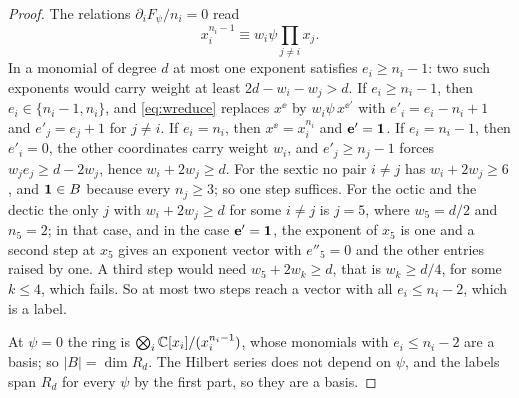 \begin{proof}
The relations $\partial_iF_\psi/n_i=0$ read
\begin{equation}\label{eq:wreduce}
x_i^{n_i-1}\equiv w_i\psi\prod_{j\ne i}x_j .
\end{equation}
In a monomial of degree $d$ at most one exponent satisfies $e_i\ge n_i-1$:
two such exponents would carry weight at least $2d-w_i-w_j>d$. If
$e_i\ge n_i-1$, then $e_i\in\{n_i-1,n_i\}$, and \eqref{eq:wreduce} replaces
$x^{\ee}$ by $w_i\psi\,x^{\ee'}$ with $e'_i=e_i-n_i+1$ and $e'_j=e_j+1$ for
$j\ne i$. If $e_i=n_i$, then $x^{\ee}=x_i^{n_i}$ and $\mathbf{e}'=\mathbf{1}$. If
$e_i=n_i-1$, then $e'_i=0$, the other coordinates carry weight $w_i$, and
$e'_j\ge n_j-1$ forces $w_je_j\ge d-2w_j$, hence $w_i+2w_j\ge d$. For the
sextic no pair $i\ne j$ has $w_i+2w_j\ge6$, and $\mathbf{1}\in B$ because every
$n_j\ge3$; so one step suffices. For the octic and the dectic the only $j$
with $w_i+2w_j\ge d$ for some $i\ne j$ is $j=5$, where $w_5=d/2$ and
$n_5=2$; in that case, and in the case $\mathbf{e}'=\mathbf{1}$, the exponent of $x_5$
is one and a second step at $x_5$ gives an exponent vector with $e''_5=0$
and the other entries raised by one. A third step would need $w_5+2w_k\ge
d$, that is $w_k\ge d/4$, for some $k\le4$, which fails. So at most two
steps reach a vector with all $e_i\le n_i-2$, which is a label.

At $\psi=0$ the ring is $\bigotimes_i\mathbb{C}[x_i]/(x_i^{n_i-1})$, whose
monomials with $e_i\le n_i-2$ are a basis; so $|B|=\dim R_d$. The Hilbert
series does not depend on $\psi$, and the labels span $R_d$ for every
$\psi$ by the first part, so they are a basis.
\end{proof}

